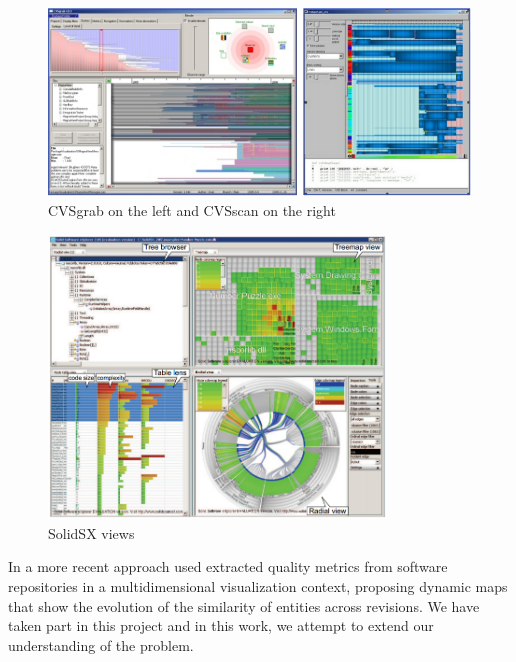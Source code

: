 \begin{figure}
 \centering
 \includegraphics[width=1.0\textwidth]{figures/cvs.png}
 \caption{CVSgrab on the left and CVSscan on the right}
 \label{fig:cvs}
\end{figure}

\begin{figure}
	\centering
	\includegraphics[width=0.8\textwidth]{figures/solidsx.png}
	\caption{SolidSX views}
	\label{fig:solidsx}
\end{figure}

In a more recent approach \citet{ref:silva2} used extracted quality metrics from software repositories in a multidimensional visualization context, proposing dynamic maps that show the evolution of the similarity of entities across revisions. We have taken part in this project and in this work, we attempt to extend our understanding of the problem.

